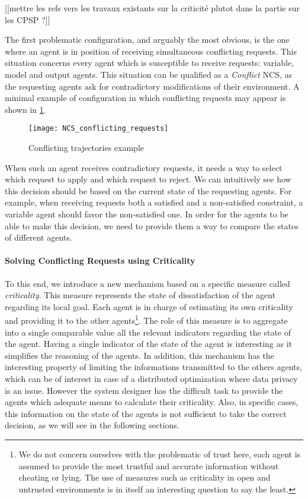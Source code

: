 [[mettre les refs vers les travaux existants sur la criticité plutot dans la partie sur les CPSP ?]]

The first problematic configuration, and arguably the most obvious, is the one where an agent is in position of receiving simultaneous conflicting requests. This situation concerns every agent which is susceptible to receive requests: variable, model and output agents. This situation can be qualified as a \emph{Conflict} NCS, as the requesting agents ask for contradictory modifications of their environment. A minimal example of configuration in which conflicting requests may appear is shown in \figurename{} \ref{NCS_conflicting_requests}.

\begin{figure}
\centering
\texttt{[image: NCS\_conflicting\_requests]}
\caption{Conflicting trajectories example}\label{NCS_conflicting_requests}
\end{figure}

When such an agent receives contradictory requests, it needs a way to select which request to apply and which request to reject. We can intuitively see how this decision should be based on the current state of the requesting agents. For example, when receiving requests both a satisfied and a non-satisfied constraint, a variable agent should favor the non-satisfied one. In order for the agents to be able to make this decision, we need to provide them a way to compare the states of different agents.

\paragraph*{Solving Conflicting Requests using Criticality}
To this end, we introduce a new mechanism based on a specific measure called \emph{criticality}. This measure represents the state of dissatisfaction of the agent regarding its local goal. Each agent is in charge of estimating its own criticality and providing it to the other agents\footnote{We do not concern ourselves with the problematic of trust here, each agent is assumed to provide the most trustful and accurate information without cheating or lying. The use of measures such as criticality in open and untrusted environments is in itself an interesting question to say the least.}. The role of this measure is to aggregate into a single comparable value all the relevant indicators regarding the state of the agent. Having a single indicator of the state of the agent is interesting as it simplifies the reasoning of the agents. In addition, this mechanism has the interesting property of limiting the informations transmitted to the others agents, which can be of interest in case of a distributed optimization where data privacy is an issue.
However the system designer has the difficult task to provide the agents which adequate means to calculate their criticality. Also, in specific cases, this information on the state of the agents is not sufficient to take the correct decision, as we will see in the following sections.

